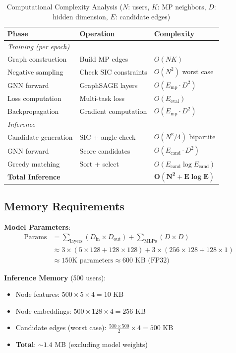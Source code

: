 \documentclass[12pt,a4paper]{article}
\begin{document}
\begin{table}[H]
\centering
\begin{tabular}{@{}lll@{}}
\toprule
\textbf{Phase} & \textbf{Operation} & \textbf{Complexity} \\
\midrule
\multicolumn{3}{l}{\textit{Training (per epoch)}} \\
\quad Graph construction & Build MP edges & $O(NK)$ \\
\quad Negative sampling & Check SIC constraints & $O(N^2)$ worst case \\
\quad GNN forward & GraphSAGE layers & $O(E_{\text{mp}} \cdot D^2)$ \\
\quad Loss computation & Multi-task loss & $O(E_{\text{eval}})$ \\
\quad Backpropagation & Gradient computation & $O(E_{\text{mp}} \cdot D^2)$ \\
\midrule
\multicolumn{3}{l}{\textit{Inference}} \\
\quad Candidate generation & SIC + angle check & $O(N^2/4)$ bipartite \\
\quad GNN forward & Score candidates & $O(E_{\text{cand}} \cdot D^2)$ \\
\quad Greedy matching & Sort + select & $O(E_{\text{cand}} \log E_{\text{cand}})$ \\
\midrule
\textbf{Total Inference} & & $\mathbf{O(N^2 + E \log E)}$ \\
\bottomrule
\end{tabular}
\caption{Computational Complexity Analysis ($N$: users, $K$: MP neighbors, $D$: hidden dimension, $E$: candidate edges)}
\end{table}

\subsection{Memory Requirements}

\textbf{Model Parameters}:
\begin{align*}
\text{Params} &= \sum_{\text{layers}} (D_{\text{in}} \times D_{\text{out}}) + \sum_{\text{MLPs}} (D \times D) \\
&\approx 3 \times (5 \times 128 + 128 \times 128) + 3 \times (256 \times 128 + 128 \times 1) \\
&\approx 150\text{K parameters} \approx 600\text{ KB (FP32)}
\end{align*}

\textbf{Inference Memory} (500 users):
\begin{itemize}
    \item Node features: $500 \times 5 \times 4 = 10$ KB
    \item Node embeddings: $500 \times 128 \times 4 = 256$ KB
    \item Candidate edges (worst case): $\frac{500 \times 500}{2} \times 4 = 500$ KB
    \item \textbf{Total}: $\sim 1.4$ MB (excluding model weights)
\end{itemize}
\end{document}
